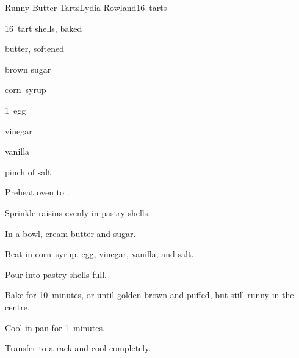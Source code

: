 \begin{recipe}{Runny Butter Tarts}{Lydia Rowland}{16~tarts}

\begin{ingredients}
\item 16~tart shells, baked
\item \C{\quarter} 
\item \C{\quarter} butter, softened
\item \C{\half} brown sugar
\item \C{\half} corn~syrup
\item 1~egg
\item {} vinegar
\item {} vanilla
\item pinch of salt
\end{ingredients}

\begin{directions}
\item Preheat oven to .
\item Sprinkle raisins evenly in pastry shells.
\item In a bowl, cream butter and sugar.
\item Beat in corn~syrup. egg, vinegar, vanilla, and salt.
\item Pour into pastry shells \threequarter{} full.
\item Bake for 10~minutes, or until golden brown and puffed, but still runny in the centre.
\item Cool in pan for 1~minutes.
\item Transfer to a rack and cool completely.
\end{directions}

\end{recipe}
